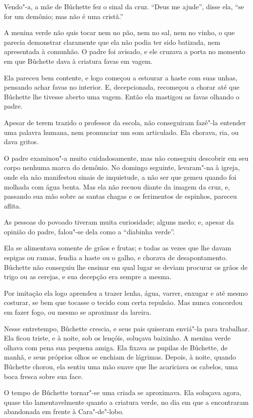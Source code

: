 Vendo"-a, a mãe de Bûchette fez o sinal da cruz. “Deus me ajude'', disse
ela, ``se for um demônio; mas não é uma cristã.”

A menina verde não quis tocar nem no pão, nem no sal, nem no vinho, o
que parecia demonstrar claramente que ela não podia ter sido batizada, nem
apresentada à comunhão. O padre foi avisado, e ele cruzava a porta no
momento em que Bûchette dava à criatura favas em vagem.

Ela pareceu bem contente, e logo começou a estourar a haste com suas
unhas, pensando achar favas no interior. E, decepcionada, recomeçou a
chorar até que Bûchette lhe tivesse aberto uma vagem. Então ela mastigou
as favas olhando o padre.

Apesar de terem trazido o professor da escola, não conseguiram fazê"-la
entender uma palavra humana, nem pronunciar um som articulado. Ela
chorava, ria, ou dava gritos.

O padre examinou"-a muito cuidadosamente, mas não conseguiu descobrir em
seu corpo nenhuma marca do demônio. No domingo seguinte, levaram"-na à
igreja, onde ela não manifestou sinais de inquietude, a não ser que gemeu
quando foi molhada com água benta. Mas ela não recuou diante da imagem da
cruz, e, passando sua mão sobre as santas chagas e os ferimentos de
espinhos, pareceu aflita.

As pessoas do povoado tiveram muita curiosidade; alguns medo; e, apesar
da opinião do padre, falou"-se dela como a “diabinha verde”.

Ela se alimentava somente de grãos e frutas; e todas as vezes que lhe
davam espigas ou ramas, fendia a haste ou o galho, e chorava de
desapontamento. Bûchette não conseguiu lhe ensinar em qual lugar se deviam
procurar os grãos de trigo ou as cerejas, e sua decepção era sempre a
mesma.

Por imitação ela logo aprendeu a trazer lenha, água, varrer, enxugar e
até mesmo costurar, se bem que tocasse o tecido com certa repulsão. Mas
nunca concordou em fazer fogo, ou mesmo se aproximar da lareira.

Nesse entretempo, Bûchette crescia, e seus pais quiseram enviá"-la para
trabalhar. Ela ficou triste, e à noite, sob os lençóis, soluçava baixinho.
A menina verde olhava com pena sua pequena amiga. Ela fixava as pupilas de
Bûchette, de manhã, e seus próprios olhos se enchiam de lágrimas. Depois,
à noite, quando Bûchette chorou, ela sentiu uma mão suave
que lhe acariciava os cabelos, uma boca fresca sobre sua face.

O tempo de Bûchette tornar"-se uma criada se aproximava. Ela soluçava
agora, quase tão lamentavelmente quanto a criatura verde, no dia em que a
encontraram abandonada em frente à Cara"-de"-lobo.

